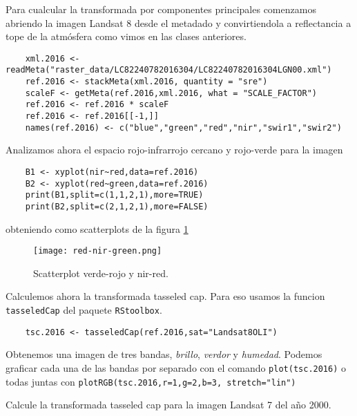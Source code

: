 \begin{exa}
    Para cualcular la transformada por componentes principales comenzamos
    abriendo la imagen Landsat 8 desde el metadado y convirtiendola a reflectancia
    a tope de la atm\'osfera como vimos en las clases anteriores.
    \begin{lstlisting}
    xml.2016 <- readMeta("raster_data/LC82240782016304/LC82240782016304LGN00.xml")
    ref.2016 <- stackMeta(xml.2016, quantity = "sre")
    scaleF <- getMeta(ref.2016,xml.2016, what = "SCALE_FACTOR")
    ref.2016 <- ref.2016 * scaleF
    ref.2016 <- ref.2016[[-1,]]
    names(ref.2016) <- c("blue","green","red","nir","swir1","swir2")
    \end{lstlisting}

    Analizamos ahora el espacio rojo-infrarrojo cercano y rojo-verde para la imagen

    \begin{lstlisting}
    B1 <- xyplot(nir~red,data=ref.2016)
    B2 <- xyplot(red~green,data=ref.2016)
    print(B1,split=c(1,1,2,1),more=TRUE)
    print(B2,split=c(2,1,2,1),more=FALSE)
    \end{lstlisting}

    obteniendo como scatterplots de la figura \ref{fig:green-red}

    \begin{figure}[h!]
    \begin{center}
        \texttt{[image: red-nir-green.png]}
    \end{center}
    \caption{Scatterplot verde-rojo y nir-red.}
    \label{fig:green-red}
    \end{figure}

    Calculemos ahora la transformada tasseled cap. Para eso usamos la funcion
    \texttt{tasseledCap} del paquete \texttt{RStoolbox}.
    \begin{lstlisting}
    tsc.2016 <- tasseledCap(ref.2016,sat="Landsat8OLI")
    \end{lstlisting}
    Obtenemos una imagen de tres bandas, \emph{brillo}, \emph{verdor} y
    \emph{humedad}. Podemos graficar cada una de las bandas por separado con el
    comando \texttt{plot(tsc.2016)} o todas juntas con \texttt{plotRGB(tsc.2016,r=1,g=2,b=3, stretch="lin")}
\end{exa}

\begin{act}
    Calcule la transformada tasseled cap para la imagen Landsat 7 del año 2000.
\end{act}

